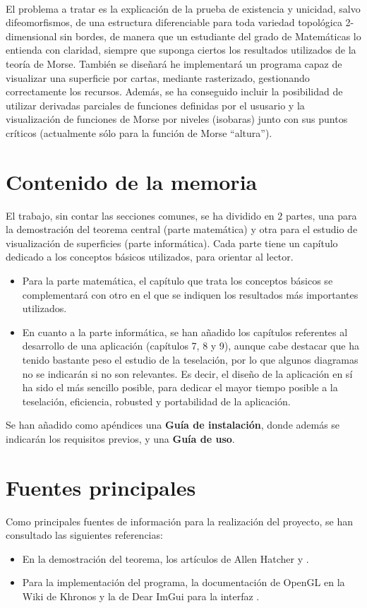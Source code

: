 \\El problema a tratar es la explicación de la prueba de existencia y unicidad, salvo difeomorfismos, de una estructura diferenciable para toda variedad topológica 2-dimensional sin bordes, de manera que un estudiante del grado de Matemáticas lo entienda con claridad, siempre que suponga ciertos los resultados utilizados de la teoría de Morse. También se diseñará he implementará un programa capaz de visualizar una superficie por cartas, mediante rasterizado, gestionando correctamente los recursos. Además, se ha conseguido incluir la posibilidad de utilizar derivadas parciales de funciones definidas por el ususario y la visualización de funciones de Morse por niveles (isobaras) junto con sus puntos críticos (actualmente sólo para la función de Morse ``altura'').

\section*{Contenido de la memoria}
El trabajo, sin contar las secciones comunes, se ha dividido en $2$ partes, una para la demostración del teorema central (parte matemática) y otra para el estudio de visualización de superficies (parte informática). Cada parte tiene un capítulo dedicado a los conceptos básicos utilizados, para orientar al lector.
\begin{itemize}
	\item Para la parte matemática, el capítulo que trata los conceptos básicos se complementará con otro en el que se indiquen los resultados más importantes utilizados.
	\item En cuanto a la parte informática, se han añadido los capítulos referentes al desarrollo de una aplicación (capítulos 7, 8 y 9), aunque cabe destacar que ha tenido bastante peso el estudio de la teselación, por lo que algunos diagramas no se indicarán si no son relevantes. Es decir, el diseño de la aplicación en sí ha sido el más sencillo posible, para dedicar el mayor tiempo posible a la teselación, eficiencia, robusted y portabilidad de la aplicación.
\end{itemize}
Se han añadido como apéndices una \textbf{Guía de instalación}, donde además se indicarán los requisitos previos, y una \textbf{Guía de uso}.

\section*{Fuentes principales}
Como principales fuentes de información para la realización del proyecto, se han consultado las siguientes referencias:
\begin{itemize}
	\item En la demostración del teorema, los artículos de Allen Hatcher \cite{arXiv:1312.3518} y \cite{MorseTh1}.
	\item Para la implementación del programa, la documentación de OpenGL en la Wiki de Khronos \cite{KhronosWiki} y la de Dear ImGui para la interfaz \cite{ImGui}.
\end{itemize}

\endinput

